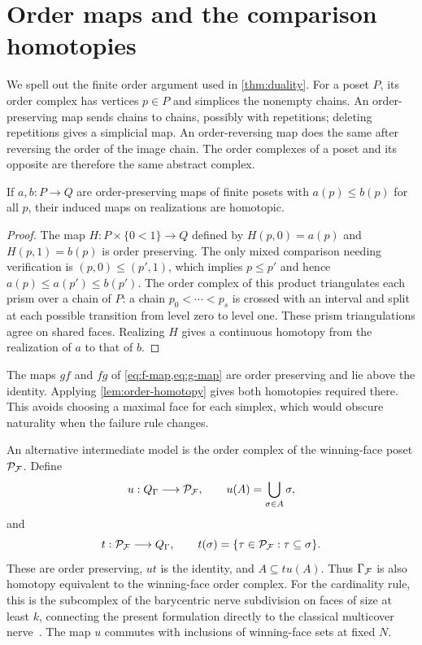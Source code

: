 \appendix
\section{Order maps and the comparison homotopies}
\label{app:posets}
We spell out the finite order argument used in \cref{thm:duality}. For a poset $P$, its order complex has vertices $p\in P$ and simplices the nonempty chains. An order-preserving map sends chains to chains, possibly with repetitions; deleting repetitions gives a simplicial map. An order-reversing map does the same after reversing the order of the image chain. The order complexes of a poset and its opposite are therefore the same abstract complex.

\begin{lemma}\label{lem:order-homotopy}
If $a,b:P\to Q$ are order-preserving maps of finite posets with $a(p)\le b(p)$ for all $p$, their induced maps on realizations are homotopic.
\end{lemma}
\begin{proof}
The map $H:P\times\{0<1\}\to Q$ defined by $H(p,0)=a(p)$ and $H(p,1)=b(p)$ is order preserving. The only mixed comparison needing verification is $(p,0)\le(p',1)$, which implies $p\le p'$ and hence $a(p)\le a(p')\le b(p')$. The order complex of this product triangulates each prism over a chain of $P$: a chain $p_0<\cdots<p_s$ is crossed with an interval and split at each possible transition from level zero to level one. These prism triangulations agree on shared faces. Realizing $H$ gives a continuous homotopy from the realization of $a$ to that of $b$.
\end{proof}

The maps $g f$ and $f g$ of \cref{eq:f-map,eq:g-map} are order preserving and lie above the identity. Applying \cref{lem:order-homotopy} gives both homotopies required there. This avoids choosing a maximal face for each simplex, which would obscure naturality when the failure rule changes.

An alternative intermediate model is the order complex of the winning-face poset $\mathcal P_{\mathcal F}$. Define
\[
u:Q_\Gamma\longrightarrow\mathcal P_{\mathcal F},\qquad u(A)=\bigcup_{\sigma\in A}\sigma,
\]
and
\[
t:\mathcal P_{\mathcal F}\longrightarrow Q_\Gamma,\qquad
t(\sigma)=\{\tau\in\mathcal P_{\mathcal F}:\tau\subseteq\sigma\}.
\]
These are order preserving, $u t$ is the identity, and $A\subseteq t u(A)$. Thus $\Gamma_{\mathcal F}$ is also homotopy equivalent to the winning-face order complex. For the cardinality rule, this is the subcomplex of the barycentric nerve subdivision on faces of size at least $k$, connecting the present formulation directly to the classical multicover nerve~\cite{sheehy}. The map $u$ commutes with inclusions of winning-face sets at fixed $N$.

